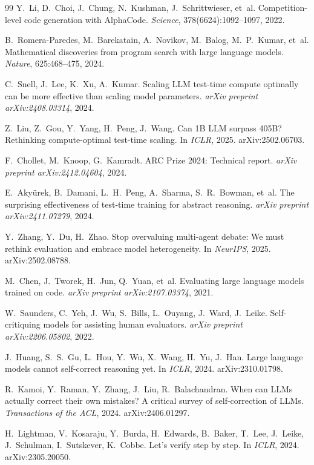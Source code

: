 \documentclass[11pt]{amsart}
\newcommand\1{{\mathds{1}}}
\theoremstyle{definition}
\theoremstyle{remark}
\numberwithin{equation}{section}
\begin{document}
\begin{thebibliography}{99}
Y.~Li, D.~Choi, J.~Chung, N.~Kushman, J.~Schrittwieser, et~al.
\newblock Competition-level code generation with AlphaCode.
\newblock \emph{Science}, 378(6624):1092--1097, 2022.

B.~Romera-Paredes, M.~Barekatain, A.~Novikov, M.~Balog, M.~P.~Kumar, et~al.
\newblock Mathematical discoveries from program search with large language models.
\newblock \emph{Nature}, 625:468--475, 2024.

C.~Snell, J.~Lee, K.~Xu, A.~Kumar.
\newblock Scaling LLM test-time compute optimally can be more effective than scaling model parameters.
\newblock \emph{arXiv preprint arXiv:2408.03314}, 2024.

Z.~Liu, Z.~Gou, Y.~Yang, H.~Peng, J.~Wang.
\newblock Can 1B LLM surpass 405B? Rethinking compute-optimal test-time scaling.
\newblock In \emph{ICLR}, 2025. arXiv:2502.06703.

F.~Chollet, M.~Knoop, G.~Kamradt.
\newblock ARC Prize 2024: Technical report.
\newblock \emph{arXiv preprint arXiv:2412.04604}, 2024.

E.~Aky\"urek, B.~Damani, L.~H.~Peng, A.~Sharma, S.~R.~Bowman, et~al.
\newblock The surprising effectiveness of test-time training for abstract reasoning.
\newblock \emph{arXiv preprint arXiv:2411.07279}, 2024.

Y.~Zhang, Y.~Du, H.~Zhao.
\newblock Stop overvaluing multi-agent debate: We must rethink evaluation and embrace model heterogeneity.
\newblock In \emph{NeurIPS}, 2025. arXiv:2502.08788.

M.~Chen, J.~Tworek, H.~Jun, Q.~Yuan, et~al.
\newblock Evaluating large language models trained on code.
\newblock \emph{arXiv preprint arXiv:2107.03374}, 2021.

W.~Saunders, C.~Yeh, J.~Wu, S.~Bills, L.~Ouyang, J.~Ward, J.~Leike.
\newblock Self-critiquing models for assisting human evaluators.
\newblock \emph{arXiv preprint arXiv:2206.05802}, 2022.

J.~Huang, S.~S.~Gu, L.~Hou, Y.~Wu, X.~Wang, H.~Yu, J.~Han.
\newblock Large language models cannot self-correct reasoning yet.
\newblock In \emph{ICLR}, 2024. arXiv:2310.01798.

R.~Kamoi, Y.~Raman, Y.~Zhang, J.~Liu, R.~Balachandran.
\newblock When can LLMs actually correct their own mistakes? A critical survey of self-correction of LLMs.
\newblock \emph{Transactions of the ACL}, 2024. arXiv:2406.01297.

H.~Lightman, V.~Kosaraju, Y.~Burda, H.~Edwards, B.~Baker, T.~Lee, J.~Leike, J.~Schulman, I.~Sutskever, K.~Cobbe.
\newblock Let's verify step by step.
\newblock In \emph{ICLR}, 2024. arXiv:2305.20050.

\end{thebibliography}
\end{document}

